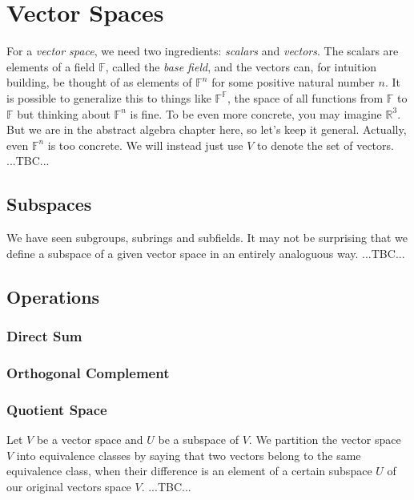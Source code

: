 \section{Vector Spaces}
For a \emph{vector space}, we need two ingredients: \emph{scalars} and \emph{vectors}. The scalars are elements of a field $\mathbb{F}$, called the \emph{base field}, and the vectors can, for intuition building, be thought of as elements of $\mathbb{F}^n$ for some positive natural number $n$. It is possible to generalize this to things like $\mathbb{F}^\mathbb{F}$, the space of all functions from $\mathbb{F}$ to $\mathbb{F}$ but thinking about $\mathbb{F}^n$ is fine. To be even more concrete, you may imagine $\mathbb{R}^3$. But we are in the abstract algebra chapter here, so let's keep it general. Actually, even $\mathbb{F}^n$ is too concrete. We will instead just use $V$ to denote the set of vectors. ...TBC...


\subsection{Subspaces} 
We have seen subgroups, subrings and subfields. It may not be surprising that we define a subspace of a given vector space in an entirely analoguous way. ...TBC...


\subsection{Operations}



\subsubsection{Direct Sum}



\subsubsection{Orthogonal Complement}





\subsubsection{Quotient Space}
Let $V$ be a vector space and $U$ be a subspace of $V$. We partition the vector space $V$ into equivalence classes by saying that two vectors belong to the same equivalence class, when their difference is an element of a certain subspace $U$ of our original vectors space $V$. ...TBC...


